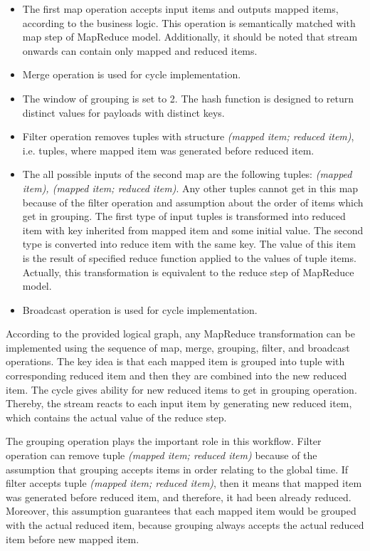 \begin{itemize}
\item The first map operation accepts input items and outputs mapped items, according to the business logic. This operation is semantically matched with map step of MapReduce model. Additionally, it should be noted that stream onwards can contain only mapped and reduced items.
\item Merge operation is used for cycle implementation.
\item The window of grouping is set to 2. The hash function is designed to return distinct values for payloads with distinct keys.
\item Filter operation removes tuples with structure \textit{(mapped item; reduced item)}, i.e. tuples, where mapped item was generated before reduced item.
\item The all possible inputs of the second map are the following tuples: \textit{(mapped item), (mapped item; reduced item)}. Any other tuples cannot get in this map because of the filter operation and assumption about the order of items which get in grouping. The first type of input tuples is transformed into reduced item with key inherited from mapped item and some initial value.  The second type is converted into reduce item with the same key. The value of this item is the result of specified reduce function applied to the values of tuple items. Actually, this transformation is equivalent to the reduce step of MapReduce model.
\item Broadcast operation is used for cycle implementation.
\end{itemize}

According to the provided logical graph, any MapReduce transformation can be implemented using the sequence of map, merge, grouping, filter, and broadcast operations. The key idea is that each mapped item is grouped into tuple with corresponding reduced item and then they are combined into the new reduced item. The cycle gives ability for new reduced items to get in grouping operation. Thereby, the stream reacts to each input item by generating new reduced item, which contains the actual value of the reduce step. 

The grouping operation plays the important role in this workflow. Filter operation can remove tuple {\it (mapped item; reduced item)} because of the assumption that grouping accepts items in order relating to the global time. If filter accepts tuple {\it (mapped item; reduced item)}, then it means that mapped item was generated before reduced item, and therefore, it had been already reduced. Moreover, this assumption guarantees that each mapped item would be grouped with the actual reduced item, because grouping always accepts the actual reduced item before new mapped item.

